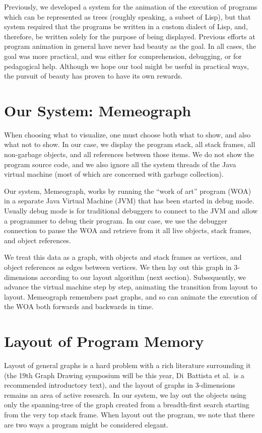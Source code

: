 \documentclass[11pt]{article}
\begin{document}
Previously, we developed a system for the animation of the execution of
programs which can be represented as trees (roughly speaking, a subset of
Lisp)\cite{boca}, but that system required that the programs be written in a
custom dialect of Lisp, and, therefore, be written solely for the purpose of
being displayed.  Previous efforts at program animation in general have never
had beauty as the goal.  In all cases, the goal was more practical, and was
either for comprehension, debugging, or for pedagogical help.  Although we hope
our tool might be useful in practical ways, the pursuit of beauty has proven to
have its own rewards.

\section{Our System: Memeograph}

When choosing what to visualize, one must choose both what to show, and also
what not to show.  In our case, we display the program stack, all stack frames,
all non-garbage objects, and all references between those items.  We do not
show the program source code, and we also ignore all the system threads of the
Java virtual machine (most of which are concerned with garbage collection).

Our system, Memeograph, works by running the ``work of art'' program (WOA) in
a separate Java Virtual Machine (JVM) that has been started in debug mode.
Usually debug mode is for traditional debuggers to connect to the JVM and allow
a programmer to debug their program. In our case, we use the debugger
connection to pause the WOA and retrieve from it all live objects, stack
frames, and object references.  

We treat this data as a graph, with objects and stack frames as vertices, and
object references as edges between vertices.  We then lay out this graph in
3-dimensions according to our layout algorithm (next section).  Subsequently,
we advance the virtual machine step by step, animating the transition from
layout to layout.  Memeograph remembers past graphs, and so can animate the
execution of the WOA both forwards and backwards in time.

\section{Layout of Program Memory}
\label{sec:layout}

Layout of general graphs is a hard problem with a rich literature surrounding
it (the 19th Graph Drawing symposium will be this year, Di~Battista et
al.\cite{gd}\ is a recommended introductory text), and the layout of graphs in
3-dimensions remains an area of active research.  In our system, we lay out the
objects using only the spanning-tree of the graph created from a breadth-first
search starting from the very top stack frame.  When layout out the program, we
note that there are two ways a program might be considered elegant. 
\end{document}

